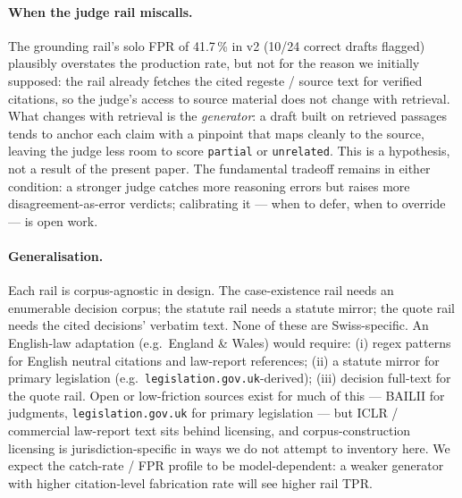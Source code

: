 \documentclass[11pt,a4paper]{article}
\begin{document}
\paragraph{When the judge rail miscalls.}
The grounding rail's solo FPR of 41.7\,\% in v2
(10/24 correct drafts flagged) plausibly overstates
the production rate, but not for the reason we
initially supposed: the rail already fetches the
cited regeste / source text for verified citations,
so the judge's access to source material does not
change with retrieval.  What changes with retrieval
is the \emph{generator}: a draft built on retrieved
passages tends to anchor each claim with a pinpoint
that maps cleanly to the source, leaving the judge
less room to score \texttt{partial} or
\texttt{unrelated}.  This is a hypothesis, not a
result of the present paper.  The fundamental
tradeoff remains in either condition: a stronger
judge catches more reasoning errors but raises more
disagreement-as-error verdicts; calibrating it ---
when to defer, when to override --- is open work.

\paragraph{Generalisation.}
Each rail is corpus-agnostic in design.  The
case-existence rail needs an enumerable decision
corpus; the statute rail needs a statute mirror; the
quote rail needs the cited decisions' verbatim text.
None of these are Swiss-specific.  An English-law
adaptation (e.g.\ England \& Wales) would require:
(i) regex patterns for English neutral citations and
law-report references; (ii) a statute mirror for
primary legislation (e.g.\
\texttt{legislation.gov.uk}-derived); (iii) decision
full-text for the quote rail.  Open or low-friction
sources exist for much of this --- BAILII for
judgments, \texttt{legislation.gov.uk} for primary
legislation --- but ICLR / commercial law-report text
sits behind licensing, and corpus-construction
licensing is jurisdiction-specific in ways we do not
attempt to inventory here.  We expect the catch-rate
/ FPR profile to be model-dependent: a weaker
generator with higher citation-level fabrication
rate will see higher rail TPR.
\end{document}
